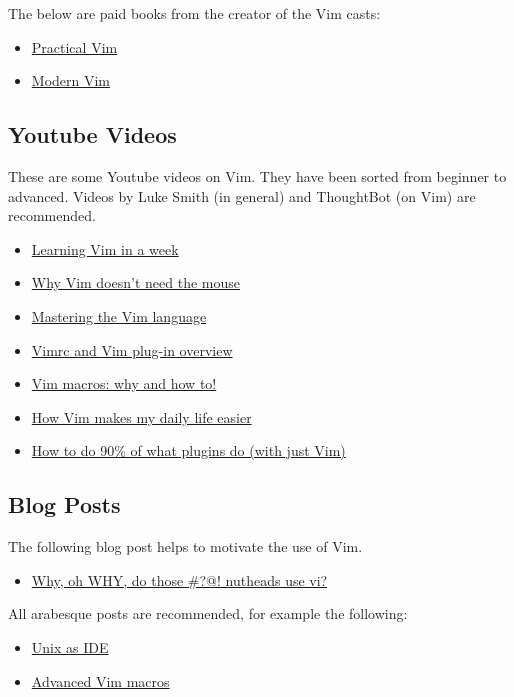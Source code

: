 \documentclass[11pt]{article}
\begin{document}
The below are paid books from the creator of the Vim casts:
\begin{itemize}
\item \href{https://pragprog.com/book/dnvim2/practical-vim-second-edition}{Practical Vim}
\item \href{https://pragprog.com/book/modvim/modern-vim}{Modern Vim}
\end{itemize}
\subsection{Youtube Videos}
\label{sec:org5562500}
These are some Youtube videos on Vim. They have been sorted from beginner to
advanced. Videos by Luke Smith (in general) and ThoughtBot (on Vim) are 
recommended.
\begin{itemize}
\item \href{https://www.youtube.com/watch?v=\_NUO4JEtkDw}{Learning Vim in a week}
\item \href{https://www.youtube.com/watch?v=tQCRVkSFFEc}{Why Vim doesn't need the mouse}
\item \href{https://www.youtube.com/watch?v=wlR5gYd6um0}{Mastering the Vim language}
\item \href{https://www.youtube.com/watch?v=cTBgtN-s2Zw}{Vimrc and Vim plug-in overview}
\item \href{https://www.youtube.com/watch?v=wRFEBw02aT8}{Vim macros: why and how to!}
\item \href{https://www.youtube.com/watch?v=NzD2UdQl5Gc}{How Vim makes my daily life easier}
\item \href{https://www.youtube.com/watch?v=XA2WjJbmmoM}{How to do 90\% of what plugins do (with just Vim)}
\end{itemize}
\subsection{Blog Posts}
\label{sec:orgde85163}
The following blog post helps to motivate the use of Vim.
\begin{itemize}
\item \href{http://www.viemu.com/a-why-vi-vim.html}{Why, oh WHY, do those \#?@! nutheads use vi?}
\end{itemize}

All arabesque posts are recommended, for example the following:
\begin{itemize}
\item \href{https://sanctum.geek.nz/arabesque/series/unix-as-ide/}{Unix as IDE}
\item \href{https://sanctum.geek.nz/arabesque/advanced-vim-macros/}{Advanced Vim macros}
\end{itemize}
\end{document}
